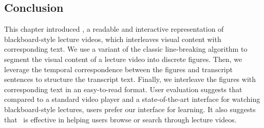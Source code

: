 

\subsection{Conclusion}
This chapter introduced \systemname , a readable and interactive representation of blackboard-style lecture videos, which interleaves visual content with corresponding text. We use a variant of the classic line-breaking algorithm to segment the visual content of a lecture video into discrete figures. Then, we leverage the temporal correspondence between the figures and transcript sentences to structure the transcript text. Finally, we interleave the figures with corresponding text in an easy-to-read format. User evaluation suggests that compared to a standard video player and a state-of-the-art interface for watching blackboard-style lectures, users prefer our interface for learning. It also suggests that \systemname\ is effective in helping users browse or search through lecture videos. 

